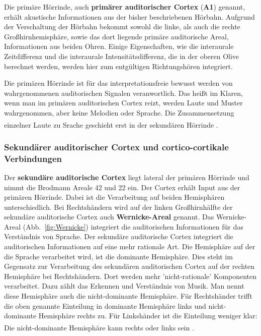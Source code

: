 Die primäre Hörrinde, auch \textbf{primärer auditorischer Cortex} (\textbf{A1}) genannt, erhält akustische Informationen aus der bisher beschriebenen Hörbahn. Aufgrund der Verschaltung der Hörbahn bekommt sowohl die linke, als auch die rechte Großhirnhemisphäre, sowie das dort liegende primäre auditorische Areal, Informationen aus beiden Ohren. Einige Eigenschaften, wie die interaurale Zeitdifferenz und die interaurale Intensitätsdifferenz, die in der oberen Olive berechnet werden, werden hier zum entgültigen Richtungshören integriert. 

Die primären Hörrinde ist für das interpretationsfreie bewusst werden von wahrgenommenen auditorischen Signalen veranwortlich. Das heißt im Klaren, wenn man im primären auditorischen Cortex reizt, werden Laute und Muster wahrgenommen, aber keine Melodien oder Sprache. Die Zusammensetzung einzelner Laute zu Srache geschieht erst in der sekundären Hörrinde \textsuperscript{\cite[Kap.~9.9]{trepel2011neuroanatomie}}.

\subsubsection*{Sekundärer auditorischer Cortex und cortico-cortikale Verbindungen}

Der \textbf{sekundäre auditorische Cortex}  liegt lateral der primären Hörrinde und nimmt die Brodmann Areale 42 und 22 ein. Der Cortex erhält Input aus der primären Hörrinde. Dabei ist die Verarbeitung auf beiden Hemisphären unterschiedlich. Bei Rechtshändern wird auf der linken Großhirnhälfte der sekundäre auditorische Cortex auch \textbf{Wernicke-Areal}  genannt. Das Wernicke-Areal (Abb.~\ref{fig:Wernicke}) integriert die auditorischen Informationen für das Verständnis von Sprache. Der sekundäre auditorische Cortex integriert die auditorischen Informationen auf eine mehr rationale Art. Die Hemisphäre auf der die Sprache verarbeitet wird, ist die dominante Hemisphäre. Dies steht im Gegensatz zur Verarbeitung des sekundären auditorischen Cortex auf der rechten Hemisphäre bei Rechtshändern. Dort werden mehr 'nicht-rationale' Komponenten verarbeitet. Dazu zählt das Erkennen und Verständnis von Musik. Man nennt diese Hemisphäre auch die nicht-dominante Hemisphäre. Für Rechtshänder trifft die oben genannte Einteilung in dominante Hemisphäre links und nicht-dominante Hemisphäre rechts zu. Für Linkshänder ist die Einteilung weniger klar: Die nicht-dominante Hemisphäre kann rechts oder links sein \textsuperscript{\cite{trepel2011neuroanatomie}}.

